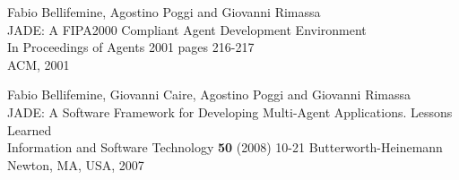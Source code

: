 \begin{thebibliography}{99}
Fabio Bellifemine, Agostino Poggi and Giovanni Rimassa\\
JADE: A FIPA2000 Compliant Agent Development Environment\\
In Proceedings of Agents 2001
pages 216-217\\
ACM, 2001

Fabio Bellifemine, Giovanni Caire, Agostino Poggi and Giovanni Rimassa\\
JADE: A Software Framework for Developing Multi-Agent Applications. Lessons Learned\\
Information and Software Technology \textbf{50} (2008) 10-21
Butterworth-Heinemann Newton, MA, USA, 2007

\end{thebibliography}

